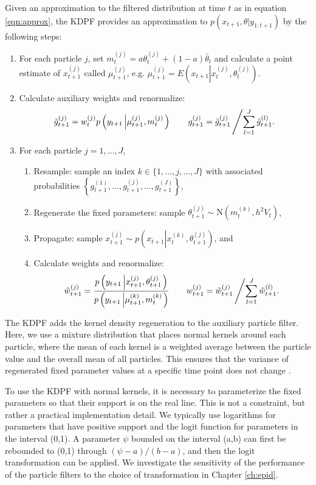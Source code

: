 Given an approximation to the filtered distribution at time $t$ as in equation \eqref{eqn:approx}, the KDPF provides an approximation to $p(x_{t+1},\theta|y_{1:t+1})$ by the following steps:
\begin{enumerate}
\item For each particle $j$, set $m_t^{(j)} = a\theta_t^{(j)} + (1-a)\bar{\theta}_t$ and calculate a point estimate of $x_{t+1}^{(j)}$ called $\mu_{t+1}^{(j)}$, e.g. $\mu_{t+1}^{(j)} = E\left(x_{t+1}\left|x_t^{(j)},\theta_t^{(j)} \right.\right)$.
\item Calculate auxiliary weights and renormalize:
\[ \tilde{g}_{t+1}^{(j)} = w_t^{(j)} p\left(y_{t+1}\left|\mu_{t+1}^{(j)},m_t^{(j)}\right.\right) \qquad g_{t+1}^{(j)} = \tilde{g}_{t+1}^{(j)}\left/ \sum_{l=1}^J \tilde{g}_{t+1}^{(l)}. \right. \]
\item For each particle $j=1,\ldots,J$,
	\begin{enumerate}
    \item Resample: sample an index $k\in\{1,\ldots,j,\ldots,J\}$ with associated probabilities $\left\{g_{t+1}^{(1)},\ldots,g_{t+1}^{(j)},\ldots,g_{t+1}^{(J)}\right\}$,
	\item Regenerate the fixed parameters: sample $\theta_{t+1}^{(j)} \sim \mbox{N}\left(m_t^{(k)}, h^2V_t \right)$,
	\item Propagate: sample $x_{t+1}^{(j)} \sim p\left(x_{t+1}\left|x_t^{(k)},\theta_{t+1}^{(j)}\right.\right)$, and
	\item Calculate weights and renormalize:
	\[ \tilde{w}_{t+1}^{(j)} = \frac{p\left(y_{t+1}\left|x_{t+1}^{(j)},\theta_{t+1}^{(j)}\right.\right)}{p\left(y_{t+1}\left|\mu_{t+1}^{(k)},m_t^{(k)}\right.\right)}
	\qquad
	w_{t+1}^{(j)} = \tilde{w}_{t+1}^{(j)}\left/\sum_{l=1}^J \tilde{w}_{t+1}^{(l)}. \right. \]
	\end{enumerate}
\end{enumerate}
The KDPF adds the kernel density regeneration to the auxiliary particle filter. Here, we use a mixture distribution that places normal kernels around each particle, where the mean of each kernel is a weighted average between the particle value and the overall mean of all particles. This ensures that the variance of regenerated fixed parameter values at a specific time point does not change \citep{Liu:West:comb:2001}.

To use the KDPF with normal kernels, it is necessary to parameterize the fixed parameters so that their support is on the real line. This is not a constraint, but rather a practical implementation detail. We typically use logarithms for parameters that have positive support and the logit function for parameters in the interval (0,1). A parameter $\psi$ bounded on the interval (a,b) can first be rebounded to (0,1) through $(\psi-a)/(b-a)$, and then the logit transformation can be applied. We investigate the sensitivity of the performance of the particle filters to the choice of transformation in Chapter \ref{ch:epid}.

